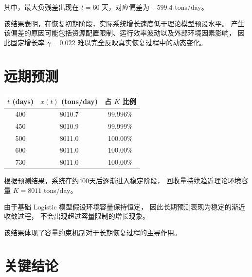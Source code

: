 \documentclass[12pt,a4paper]{article}
\begin{document}
其中，最大负残差出现在 $t=60$ 天，对应偏差为
$-599.4$ tons/day。

该结果表明，在恢复初期阶段，实际系统增长速度低于理论模型预设水平。
产生该偏差的原因可能包括资源配置限制、运行效率波动以及外部环境因素影响，
因此固定增长率 $\gamma=0.022$ 难以完全反映真实恢复过程中的动态变化。

\section{远期预测}

\begin{center}
\begin{tabular}{ccc}
\toprule
$t$ (days) & $x(t)$ (tons/day) & 占 $K$ 比例 \\
\midrule
400 & 8010.7 & 99.996\% \\
450 & 8010.9 & 99.999\% \\
500 & 8011.0 & 100.00\% \\
600 & 8011.0 & 100.00\% \\
730 & 8011.0 & 100.00\% \\
\bottomrule
\end{tabular}
\end{center}

根据预测结果，系统在约400天后逐渐进入稳定阶段，
回收量持续趋近理论环境容量 $K=8011$ tons/day。

由于基础 Logistic 模型假设环境容量保持恒定，
因此长期预测表现为稳定的渐近收敛过程，
不会出现超过容量限制的增长现象。

该结果体现了容量约束机制对于长期恢复过程的主导作用。

\section{关键结论}
\end{document}
